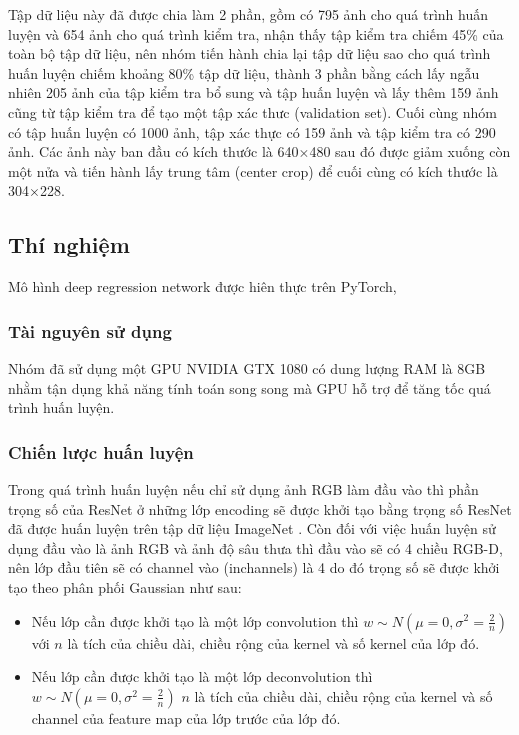  Tập dữ liệu này đã được chia làm 2 phần, gồm có 795 ảnh cho quá trình huấn luyện và 654 ảnh cho quá trình kiểm tra, nhận thấy tập kiểm tra chiếm 45\% của toàn bộ tập dữ liệu, nên nhóm tiến hành chia lại tập dữ liệu sao cho quá trình huấn luyện chiếm khoảng 80\% tập dữ liệu, thành 3 phần bằng cách lấy ngẫu nhiên 205 ảnh của tập kiểm tra bổ sung và tập huấn luyện và lấy thêm 159 ảnh cũng từ tập kiểm tra để tạo một tập xác thưc (validation set). Cuối cùng nhóm có tập huấn luyện có 1000 ảnh, tập xác thực có 159 ảnh và tập kiểm tra có 290 ảnh. Các ảnh này ban đầu có kích thước là 640$\times$480 sau đó được giảm xuống còn một nửa và tiến hành lấy trung tâm (center crop) để cuối cùng có kích thước là 304$\times$228.
\subsection{Thí nghiệm}
Mô hình deep regression network được hiên thực trên PyTorch,
\subsubsection{Tài nguyên sử dụng}
Nhóm đã sử dụng một GPU NVIDIA GTX 1080 có dung lượng RAM là 8GB nhằm tận dụng khả năng tính toán song song mà GPU hỗ trợ để tăng tốc quá trình huấn luyện.
\subsubsection{Chiến lược huấn luyện}
Trong quá trình huấn luyện nếu chỉ sử dụng ảnh RGB làm đầu vào thì phần trọng số của ResNet ở những lớp encoding sẽ được khởi tạo bằng trọng số ResNet đã được huấn luyện trên tập dữ liệu ImageNet \cite{Imagenet}. Còn đối với việc huấn luyện sử dụng đầu vào là ảnh RGB và ảnh độ sâu thưa thì đầu vào sẽ có 4 chiều RGB-D, nên lớp đầu tiên sẽ có channel vào (inchannels) là 4 do đó trọng số sẽ được khởi tạo theo phân phối Gaussian như sau:
\begin{itemize}
\item Nếu lớp cần được khởi tạo là một lớp convolution thì  $ w \sim  N( \mu = 0,\sigma ^{2} = \frac{2}{n} )$ với $n$ là tích của chiều dài, chiều rộng của kernel và số kernel của lớp đó.
\item Nếu lớp cần được khởi tạo là một lớp deconvolution thì $ w \sim  N( \mu = 0,\sigma ^{2} = \frac{2}{n} )$ $n$ là tích của chiều dài, chiều rộng của kernel và số channel của feature map của lớp trước của lớp đó.
\end{itemize}

